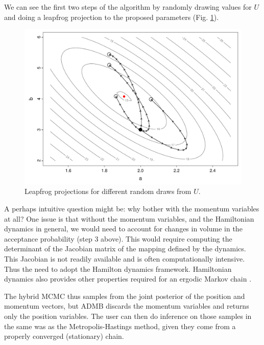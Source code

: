 \documentclass{article}\usepackage[]{graphicx}\usepackage[]{color}
\begin{document}
We can see the first two steps of the algorithm by randomly
drawing values for $U$ and doing a leapfrog projection to
the proposed parameters (Fig. \ref{fig:hybrid_seeds}).
\begin{figure}[h]
  \centering
  \includegraphics[width=5in]{../plots/hybrid_seeds.pdf}
  \caption{Leapfrog projections for different random draws
    from $U$.}
  \label{fig:hybrid_seeds}
\end{figure}

A perhaps intuitive question might be: why bother with the
momentum variables at all? One issue is that without the
momentum variables, and the Hamiltonian dynamics in general,
we would need to account for changes in volume in the
acceptance probability (step 3 above)\cite{brooks2011}. This
would require computing the determinant of the Jacobian
matrix of the mapping defined by the dynamics. This Jacobian
is not readily available and is often computationally
intensive. Thus the need to adopt the Hamilton dynamics
framework.  Hamiltonian dynamics also provides other
properties required for an ergodic Markov chain
\cite{brooks2011}.

The hybrid MCMC thus samples from the joint posterior of the
position and momentum vectors, but ADMB discards the
momentum variables and returns only the position
variables. The user can then do inference on those samples
in the same was as the Metropolis-Hastings method, given
they come from a properly converged (stationary) chain.
\end{document}
